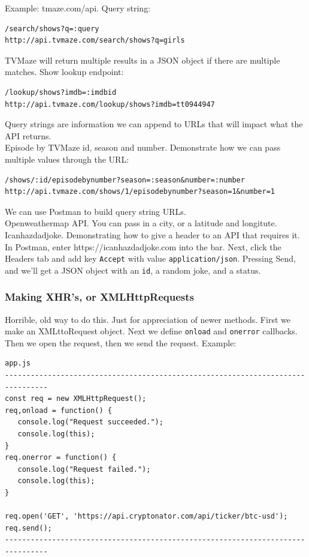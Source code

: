 \documentclass[11pt, letterpaper]{article}
\begin{document}
Example: tmaze.com/api. Query string: 

\begin{verbatim}
/search/shows?q=:query 
http://api.tvmaze.com/search/shows?q=girls
\end{verbatim}

TVMaze will return multiple results in a JSON object if there are multiple matches. Show lookup endpoint:

\begin{verbatim}
/lookup/shows?imdb=:imdbid
http://api.tvmaze.com/lookup/shows?imdb=tt0944947
\end{verbatim}

Query strings are information we can append to URLs that will impact what the API returns. \\

Episode by TVMaze id, season and number. Demonstrate how we can pass multiple values through the URL:

\begin{verbatim}
/shows/:id/episodebynumber?season=:season&number=:number
http://api.tvmaze.com/shows/1/episodebynumber?season=1&number=1
\end{verbatim}

We can use Postman to build query string URLs. \\

Openweathermap API. You can pass in a city, or a latitude and longitute. \\

Icanhazdadjoke. Demonstrating how to give a header to an API that requires it. In Postman, enter 
https://icanhazdadjoke.com into the bar. Next, click the Headers tab and add key \verb+Accept+ with 
value \verb+application/json+. Pressing Send, and we'll get a JSON object with an \verb+id+, a random joke,
and a status. 

\subsubsection*{Making XHR's, or XMLHttpRequests}

Horrible, old way to do this. Just for appreciation of newer methods. First we make an XMLttoRequest object.
Next we define \verb+onload+ and \verb+onerror+ callbacks. Then we open the request, then we send the request. Example:

{\small
\begin{verbatim}
app.js
--------------------------------------------------------------------------------
const req = new XMLHttpRequest();
req,onload = function() {
   console.log("Request succeeded.");
   console.log(this);
}
req.onerror = function() {
   console.log("Request failed.");
   console.log(this);
}

req.open('GET', 'https://api.cryptonator.com/api/ticker/btc-usd');
req.send();
--------------------------------------------------------------------------------
\end{verbatim}
}
\end{document}
